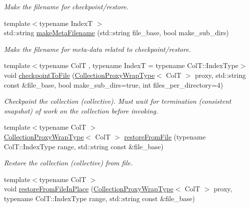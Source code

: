 \begin{DoxyCompactItemize}
\begin{DoxyCompactList}\small\item\em Make the filename for checkpoint/restore. \end{DoxyCompactList}\item 
{\footnotesize template$<$typename IndexT $>$ }\\std\+::string \hyperlink{structvt_1_1vrt_1_1collection_1_1_collection_manager_abe41e7e9c9dec081a79b222b4c5dc199}{make\+Meta\+Filename} (std\+::string file\+\_\+base, bool make\+\_\+sub\+\_\+dirs)
\begin{DoxyCompactList}\small\item\em Make the filename for meta-\/data related to checkpoint/restore. \end{DoxyCompactList}\item 
{\footnotesize template$<$typename ColT , typename IndexT  = typename Col\+T\+::\+Index\+Type$>$ }\\void \hyperlink{structvt_1_1vrt_1_1collection_1_1_collection_manager_af3771d408c2ef15e65b9ba8219aa830a}{checkpoint\+To\+File} (\hyperlink{structvt_1_1vrt_1_1collection_1_1_collection_manager_a56458ed7f9bb22b631b9b3a745f42f94}{Collection\+Proxy\+Wrap\+Type}$<$ ColT $>$ proxy, std\+::string const \&file\+\_\+base, bool make\+\_\+sub\+\_\+dirs=true, int files\+\_\+per\+\_\+directory=4)
\begin{DoxyCompactList}\small\item\em Checkpoint the collection (collective). Must wait for termination (consistent snapshot) of work on the collection before invoking. \end{DoxyCompactList}\item 
{\footnotesize template$<$typename ColT $>$ }\\\hyperlink{structvt_1_1vrt_1_1collection_1_1_collection_manager_a56458ed7f9bb22b631b9b3a745f42f94}{Collection\+Proxy\+Wrap\+Type}$<$ ColT $>$ \hyperlink{structvt_1_1vrt_1_1collection_1_1_collection_manager_a315a74b9299f31ebc5e3e4becdd9f79e}{restore\+From\+File} (typename Col\+T\+::\+Index\+Type range, std\+::string const \&file\+\_\+base)
\begin{DoxyCompactList}\small\item\em Restore the collection (collective) from file. \end{DoxyCompactList}\item 
{\footnotesize template$<$typename ColT $>$ }\\void \hyperlink{structvt_1_1vrt_1_1collection_1_1_collection_manager_a401419597474752d8554a6f96a972a6b}{restore\+From\+File\+In\+Place} (\hyperlink{structvt_1_1vrt_1_1collection_1_1_collection_manager_a56458ed7f9bb22b631b9b3a745f42f94}{Collection\+Proxy\+Wrap\+Type}$<$ ColT $>$ proxy, typename Col\+T\+::\+Index\+Type range, std\+::string const \&file\+\_\+base)

\end{DoxyCompactItemize}
